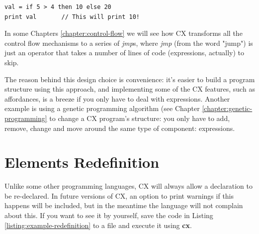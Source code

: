 \documentclass[11pt,fleqn,openany]{book} %
\begin{document}
\begin{lstlisting}[caption={Example of if/else Statement as an Expression},captionpos=b,label={listing:statement-as-expression}]
val = if 5 > 4 then 10 else 20
print val       // This will print 10!
\end{lstlisting}

In some Chapters \ref{chapter:control-flow} we will see how CX transforms all the control flow mechanisms to a series of \textit{jmp}s, where \textit{jmp} (from the word "jump") is just an operator that takes a number of lines of code (expressions, actually) to skip.

The reason behind this design choice is convenience: it's easier to build a program structure using this approach, and implementing some of the CX features, such as affordances, is a breeze if you only have to deal with expressions. Another example is using a genetic programming algorithm (see Chapter \ref{chapter:genetic-programming} to change a CX program's structure: you only have to add, remove, change and move around the same type of component: expressions.

\section{Elements Redefinition}


Unlike some other programming languages, CX will always allow a declaration to be re-declared. In future versions of CX, an option to print warnings if this happens will be included, but in the meantime the language will not complain about this. If you want to see it by yourself, save the code in Listing \ref{listing:example-redefinition} to a file and execute it using \textbf{cx}.
\end{document}

